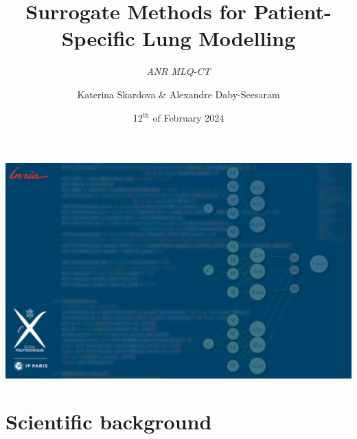 \documentclass[aspectratio=1610, 10pt]{beamer}
\author[\textcolor{white!70!black}{Katka \& Alexandre}]{\textcolor{BleuLMS!10}{Katerina Skardova \& Alexandre Daby-Seesaram}} %
\title[ANR \\ MLQ-CT] %
{\bfseries \textcolor{BleuLMS!10}{Surrogate Methods for Patient-Specific Lung Modelling}
}
\subtitle{\itshape\textcolor{GreenLMS!10}{ANR MLQ-CT}}
\date[VLC 2023] %
{\textcolor{BleuLMS!10}{12$^{\text{th}}$ of February 2024}}
\begin{document}
			{
			{	\hspace*{\sidebarwidth}
				\hspace{-1.9cm}
				
			\includegraphics[width=1.121\imagewidth]{Logos/LMS/TitlePage.png}
			}
			\frame[plain]{\titlepage} 
		}
	\section{Scientific background}
\end{document}
